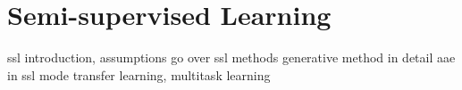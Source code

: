 \chapter{Semi-supervised Learning}
\label{chap:SemisupervisedLearning}

ssl introduction, assumptions
go over ssl methods
generative method in detail
aae in ssl mode
transfer learning, multitask learning
